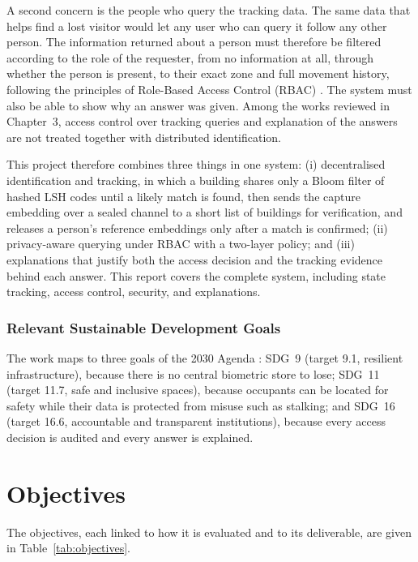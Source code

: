 \documentclass[12pt,a4paper,oneside]{report}
\begin{document}
A second concern is the people who query the tracking data. The same data that helps find a lost visitor would let any user who can query it follow any other person. The information returned about a person must therefore be filtered according to the role of the requester, from no information at all, through whether the person is present, to their exact zone and full movement history, following the principles of Role-Based Access Control (RBAC) \cite{ref21}. The system must also be able to show why an answer was given. Among the works reviewed in Chapter~3, access control over tracking queries and explanation of the answers are not treated together with distributed identification.

This project therefore combines three things in one system: (i) decentralised identification and tracking, in which a building shares only a Bloom filter of hashed LSH codes until a likely match is found, then sends the capture embedding over a sealed channel to a short list of buildings for verification, and releases a person's reference embeddings only after a match is confirmed; (ii) privacy-aware querying under RBAC with a two-layer policy; and (iii) explanations that justify both the access decision and the tracking evidence behind each answer. This report covers the complete system, including state tracking, access control, security, and explanations.

\subsubsection{Relevant Sustainable Development Goals}
The work maps to three goals of the 2030 Agenda \cite{ref27}: SDG~9 (target 9.1, resilient infrastructure), because there is no central biometric store to lose; SDG~11 (target 11.7, safe and inclusive spaces), because occupants can be located for safety while their data is protected from misuse such as stalking; and SDG~16 (target 16.6, accountable and transparent institutions), because every access decision is audited and every answer is explained.

\section{Objectives}
The objectives, each linked to how it is evaluated and to its deliverable, are given in Table~\ref{tab:objectives}.
\end{document}
